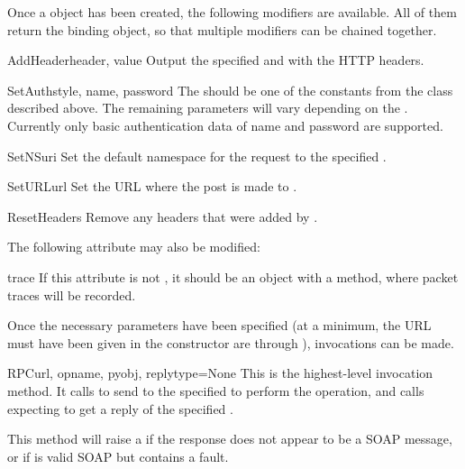 Once a  object has been created, the following modifiers are
available.
All of them return the binding object, so that multiple modifiers can
be chained together.

\begin{methoddesc}{AddHeader}{header, value}
Output the specified  and  with the HTTP
headers.
\end{methoddesc}

\begin{methoddesc}{SetAuth}{style, name, password}
The  should be one of the constants from the 
class described above.
The remaining parameters will vary depending on the .
Currently only basic authentication data of name and password are
supported.
\end{methoddesc}

\begin{methoddesc}{SetNS}{uri}
Set the default namespace for the request to the specified .
\end{methoddesc}

\begin{methoddesc}{SetURL}{url}
Set the URL where the post is made to .
\end{methoddesc}

\begin{methoddesc}{ResetHeaders}{}
Remove any headers that were added by .
\end{methoddesc}

The following attribute may also be modified:

\begin{memberdesc}{trace}
If this attribute is not , it should be an object with a
 method, where packet traces will be recorded.
\end{memberdesc}

Once the necessary parameters have been specified (at a minimum, the URL
must have been given in the constructor are through ),
invocations can be made.

\begin{methoddesc}{RPC}{url, opname, pyobj, replytype=None}
This is the highest-level invocation method.
It calls  to send  to the specified 
to perform the  operation,
and calls  expecting to get a reply of the specified
.

This method will raise a  if the response does not
appear to be a SOAP message, or if is valid SOAP but contains a fault.
\end{methoddesc}

